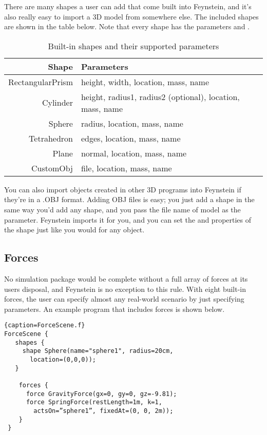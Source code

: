 There are many shapes a user can add that come built into Feynstein,
and it's also really easy to import a 3D model from somewhere
else. The included shapes are shown in the table below. Note that
every shape has the parameters  and .

\begin{table}\centering
  \begin{tabular}{r|l}
    \textbf{Shape} & \textbf{Parameters} \\ \hline
    RectangularPrism & height, width, location, mass, name \\
    Cylinder & height, radius1, radius2 (optional), location, mass, name \\
    Sphere & radius, location, mass, name \\
    Tetrahedron & edges, location, mass, name \\
    Plane & normal, location, mass, name \\
    CustomObj & file, location, mass, name \\
  \end{tabular} 
\caption{Built-in shapes and their supported parameters}
\label{tab:shapestut}
\end{table}

You can also import objects created in other 3D programs into
Feynstein if they're in a .OBJ format. Adding OBJ files is easy; you
just add a  shape in the same way you'd add any shape, and
you pass the file name of model as the  parameter. Feynstein
imports it for you, and you can set the  and 
properties of the shape just like you would for any object.

\subsection{Forces}
No simulation package would be complete without a full array of forces
at its users disposal, and Feynstein is no exception to this
rule. With eight built-in forces, the user can specify almost any
real-world scenario by just specifying parameters. An example program
that includes forces is shown below.

\begin{lstlisting}{caption=ForceScene.f}
ForceScene {
   shapes {
     shape Sphere(name="sphere1", radius=20cm, 
       location=(0,0,0));
   }

    forces {
      force GravityForce(gx=0, gy=0, gz=-9.81);
      force SpringForce(restLength=1m, k=1, 
        actsOn=”sphere1”, fixedAt=(0, 0, 2m));
    }
 }
\end{lstlisting}

